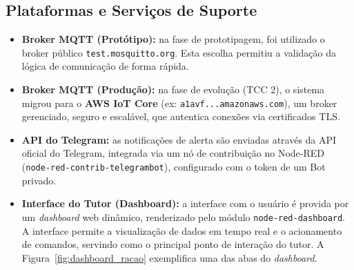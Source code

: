 \begin{table}[H]
\centering
\caption{Estrutura da tabela \texttt{historico} do banco de dados.}
\label{tab:db_schema}
\caption*{Fonte: Elaborado pelo autor (2025).}
\end{table}

\subsection{Plataformas e Serviços de Suporte}
\begin{itemize}
    \item \textbf{Broker MQTT (Protótipo):} na fase de prototipagem, foi utilizado o broker público \texttt{test.mosquitto.org}.
Esta escolha permitiu a validação da lógica de comunicação de forma rápida.
\item \textbf{Broker MQTT (Produção):} na fase de evolução (TCC 2), o sistema migrou para o \textbf{AWS IoT Core} (ex: \texttt{a1avf...amazonaws.com}), um broker gerenciado, seguro e escalável, que autentica conexões via certificados TLS.
\item \textbf{API do Telegram:} as notificações de alerta são enviadas através da API oficial do Telegram, integrada via um nó de contribuição no Node-RED (\texttt{node-red-contrib-telegrambot}), configurado com o token de um Bot privado.
\item \textbf{Interface do Tutor (Dashboard):} a interface com o usuário é provida por um \textit{dashboard} web dinâmico, renderizado pelo módulo \texttt{node-red-dashboard}.
A interface permite a visualização de dados em tempo real e o acionamento de comandos, servindo como o principal ponto de interação do tutor.
A Figura~\ref{fig:dashboard_racao} exemplifica uma das abas do \textit{dashboard}.
\end{itemize}

